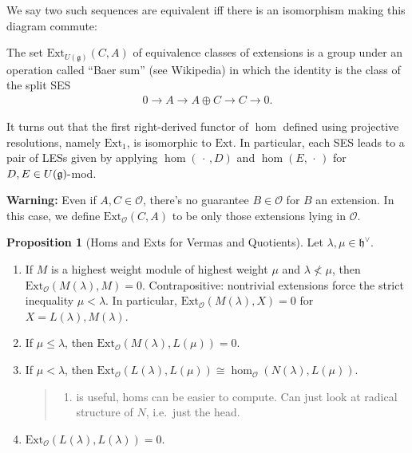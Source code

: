 \documentclass[11pt]{scrartcl}
\theoremstyle{definition}
\theoremstyle{theorem}
\newtheorem{proposition}[theorem]{Proposition}
\theoremstyle{proof}
\theoremstyle{definition}
\theoremstyle{break}
\theoremstyle{problem}
\providecommand{\tightlist}{%
  \setlength{\itemsep}{0pt}\setlength{\parskip}{0pt}}
\newcommand{\ext}[0]{\text{Ext}}
\newcommand{\dash}[0]{{\hbox{-}}}
\newcommand{\dual}[0]{^\vee}
\newcommand{\lieg}[0]{{\mathfrak{g}}}
\newcommand{\lieh}[0]{{\mathfrak{h}}}
\newcommand{\OO}[0]{{\mathcal{O}}}
\newcommand{\wait}[0]{{\,\cdot\,}}
\renewcommand{\to}[0]{\longrightarrow}
\begin{document}
We say two such sequences are equivalent iff there is an isomorphism
making this diagram commute:

\begin{center}
\end{center}

The set \(\ext_{U(\lieg)}(C, A)\) of equivalence classes of extensions
is a group under an operation called ``Baer sum'' (see Wikipedia) in
which the identity is the class of the split SES
\begin{align*}
0 \to A \to A\oplus C \to C \to 0.
\end{align*}

It turns out that the first right-derived functor of \(\hom\) defined
using projective resolutions, namely \(\ext_1\), is isomorphic to
\(\ext\). In particular, each SES leads to a pair of LESs given by
applying \(\hom(\wait, D)\) and \(\hom(E, \wait)\) for
\(D, E \in U(\lieg)\dash\)mod.

\textbf{Warning:} Even if \(A, C\in \OO\), there's no guarantee
\(B\in \OO\) for \(B\) an extension. In this case, we define
\(\ext_\OO(C, A)\) to be only those extensions lying in \(\OO\).

\begin{proposition}[Homs and Exts for Vermas and Quotients]

Let \(\lambda, \mu \in \lieh\dual\).

\begin{enumerate}
\def\labelenumi{\alph{enumi}.}
\item
  If \(M\) is a highest weight module of highest weight \(\mu\) and
  \(\lambda \not< \mu\), then \(\ext_\OO(M(\lambda), M) = 0\).
  Contrapositive: nontrivial extensions force the strict inequality
  \(\mu < \lambda\). In particular, \(\ext_\OO(M(\lambda), X) = 0\) for
  \(X = L(\lambda), M(\lambda)\).
\item
  If \(\mu \leq \lambda\), then \(\ext_\OO(M(\lambda), L(\mu)) = 0\).
\item
  If \(\mu < \lambda\), then
  \(\ext_\OO(L(\lambda), L(\mu)) \cong \hom_\OO(N(\lambda), L(\mu))\).

  \begin{quote}
  \begin{enumerate}
  \def\labelenumii{(\alph{enumii})}
  \setcounter{enumii}{2}
  \tightlist
  \item
    is useful, homs can be easier to compute. Can just look at radical
    structure of \(N\), i.e.~just the head.
  \end{enumerate}
  \end{quote}
\item
  \(\ext_\OO(L(\lambda), L(\lambda)) = 0\).
\end{enumerate}

\end{proposition}
\end{document}
